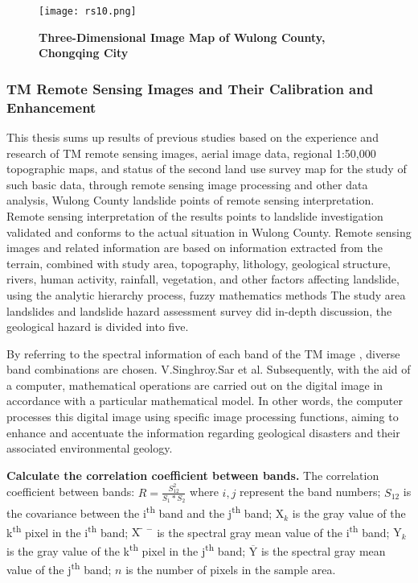 \documentclass[conference]{IEEEtran}
\begin{document}
\begin{figure}[h]
    \centering
    \texttt{[image: rs10.png]}
    \caption{\textbf{Three-Dimensional Image Map of Wulong County, Chongqing City}}
    \label{fig:enter-label}
\end{figure}
\subsubsection{TM Remote Sensing Images and Their Calibration and Enhancement}
This thesis sums up results of previous studies based on the experience and research of TM remote sensing images, aerial image data, regional 1:50,000 topographic maps, and status of the second land use survey map for the study of such basic data, through remote sensing image processing and other data analysis, Wulong County landslide points of remote sensing interpretation. Remote sensing interpretation of the results points to landslide investigation validated and conforms to the actual situation in Wulong County. Remote sensing images and related information are based on information extracted from the terrain, combined with study area, topography, lithology, geological structure, rivers, human activity, rainfall, vegetation, and other factors affecting landslide, using the analytic hierarchy process, fuzzy mathematics methods The  study area landslides and landslide hazard assessment survey did in-depth discussion, the geological hazard is divided into five.

By referring to the spectral information of each band of the TM image , diverse band combinations are chosen. V.Singhroy.Sar et al.\cite{b74} Subsequently, with the aid of a computer, mathematical operations are carried out on the digital image in accordance with a particular mathematical model. In other words, the computer processes this digital image using specific image processing functions, aiming to enhance and accentuate the information regarding geological disasters and their associated environmental geology.

\textbf{Calculate the correlation coefficient between bands.} The correlation coefficient between bands: $R=\frac{S_{12}^2}{S_1*S_2}$ where $i, j$ represent the band numbers; $S_{12}$ is the covariance between the i\textsuperscript{th} band and the j\textsuperscript{th} band; $\mathrm{X}_k$ is the gray value of the k\textsuperscript{th} pixel in the i\textsuperscript{th} band; $\mathrm{X̅}^-$ is the spectral gray mean value of the i\textsuperscript{th} band; $\mathrm{Y}_k$ is the gray value of the k\textsuperscript{th} pixel in the j\textsuperscript{th} band; $\overline{\mathrm{Y}}$ is the spectral gray mean value of the j\textsuperscript{th} band; $n$ is the number of pixels in the sample area. 
\end{document}

